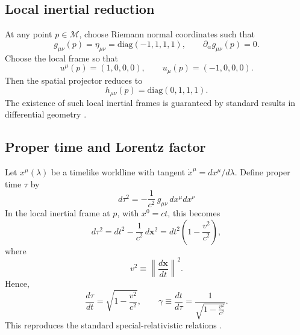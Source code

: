 \documentclass[11pt]{article}
\begin{document}
    \subsection{Local inertial reduction}

        At any point $p\in\mathcal{M}$, choose Riemann normal coordinates such that
        \begin{equation}
            g_{\mu\nu}(p) = \eta_{\mu\nu} = \mathrm{diag}(-1,1,1,1), \qquad
            \partial_\alpha g_{\mu\nu}(p) = 0 .
        \end{equation}
        Choose the local frame so that
        \begin{equation}
            u^\mu(p) = (1,0,0,0), \qquad
            u_\mu(p) = (-1,0,0,0).
        \end{equation}
        Then the spatial projector reduces to
        \begin{equation}
            h_{\mu\nu}(p) = \mathrm{diag}(0,1,1,1).
        \end{equation}
        The existence of such local inertial frames is guaranteed by standard results in
        differential geometry \cite{misnerthorne_wheeler1973,carroll2004}.

    \subsection{Proper time and Lorentz factor}

        Let $x^\mu(\lambda)$ be a timelike worldline with tangent
        $\dot{x}^\mu = dx^\mu/d\lambda$.
        Define proper time $\tau$ by
        \begin{equation}
            \boxed{
            d\tau^2 = -\frac{1}{c^2}\, g_{\mu\nu}\, dx^\mu dx^\nu
            }
        \end{equation}
        In the local inertial frame at $p$, with $x^0 = ct$, this becomes
        \begin{equation}
            d\tau^2
            = dt^2 - \frac{1}{c^2}\, d\mathbf{x}^2
            = dt^2\!\left(1-\frac{v^2}{c^2}\right),
        \end{equation}
        where
        \begin{equation}
            v^2 \equiv \left\lVert \frac{d\mathbf{x}}{dt} \right\rVert^2 .
        \end{equation}
        Hence,
        \begin{equation}
            \frac{d\tau}{dt} = \sqrt{1-\frac{v^2}{c^2}}, \qquad
            \gamma \equiv \frac{dt}{d\tau} = \frac{1}{\sqrt{1-\frac{v^2}{c^2}}}.
        \end{equation}
        This reproduces the standard special-relativistic relations
        \cite{einstein1905,ryder1996}.
\end{document}
